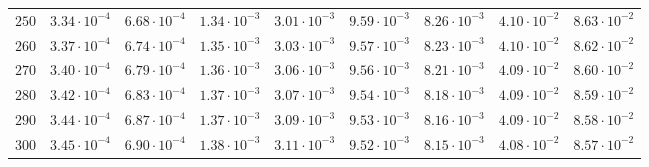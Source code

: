 \begin{landscape}
\begin{table}
\begin{tabular}{lcccccccc}
$	250	$ & $	3.34 \cdot 10^{-4}	$ & $	6.68 \cdot 10^{-4}	$ & $	1.34 \cdot 10^{-3}	$ & $	3.01 \cdot 10^{-3}	$ & $	9.59 \cdot 10^{-3}	$ & $	8.26 \cdot 10^{-3}	$ & $	4.10 \cdot 10^{-2}	$ & $	8.63 \cdot 10^{-2}	 $ \\
$	260	$ & $	3.37 \cdot 10^{-4}	$ & $	6.74 \cdot 10^{-4}	$ & $	1.35 \cdot 10^{-3}	$ & $	3.03 \cdot 10^{-3}	$ & $	9.57 \cdot 10^{-3}	$ & $	8.23 \cdot 10^{-3}	$ & $	4.10 \cdot 10^{-2}	$ & $	8.62 \cdot 10^{-2}	 $ \\
$	270	$ & $	3.40 \cdot 10^{-4}	$ & $	6.79 \cdot 10^{-4}	$ & $	1.36 \cdot 10^{-3}	$ & $	3.06 \cdot 10^{-3}	$ & $	9.56 \cdot 10^{-3}	$ & $	8.21 \cdot 10^{-3}	$ & $	4.09 \cdot 10^{-2}	$ & $	8.60 \cdot 10^{-2}	 $ \\
$	280	$ & $	3.42 \cdot 10^{-4}	$ & $	6.83 \cdot 10^{-4}	$ & $	1.37 \cdot 10^{-3}	$ & $	3.07 \cdot 10^{-3}	$ & $	9.54 \cdot 10^{-3}	$ & $	8.18 \cdot 10^{-3}	$ & $	4.09 \cdot 10^{-2}	$ & $	8.59 \cdot 10^{-2}	 $ \\
$	290	$ & $	3.44 \cdot 10^{-4}	$ & $	6.87 \cdot 10^{-4}	$ & $	1.37 \cdot 10^{-3}	$ & $	3.09 \cdot 10^{-3}	$ & $	9.53 \cdot 10^{-3}	$ & $	8.16 \cdot 10^{-3}	$ & $	4.09 \cdot 10^{-2}	$ & $	8.58 \cdot 10^{-2}	 $ \\
$	300	$ & $	3.45 \cdot 10^{-4}	$ & $	6.90 \cdot 10^{-4}	$ & $	1.38 \cdot 10^{-3}	$ & $	3.11 \cdot 10^{-3}	$ & $	9.52 \cdot 10^{-3}	$ & $	8.15 \cdot 10^{-3}	$ & $	4.08 \cdot 10^{-2}	$ & $	8.57 \cdot 10^{-2}	 $ \\
    \hline
  \end{tabular}
  \end{table}
\end{landscape}

